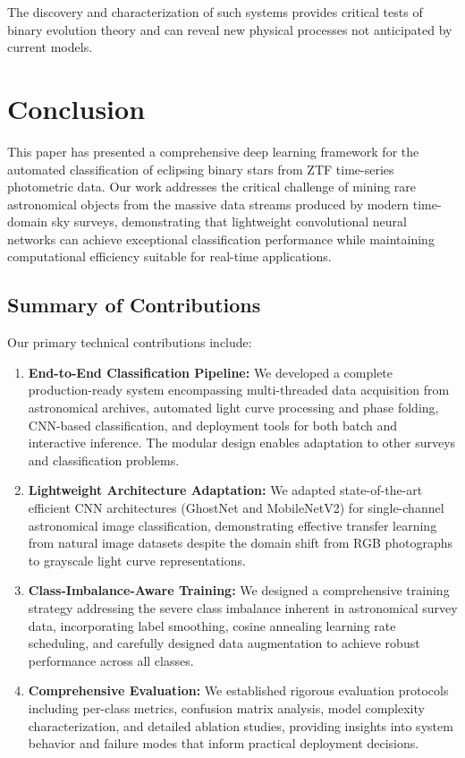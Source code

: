 \documentclass[11pt,a4paper]{article}
\begin{document}
The discovery and characterization of such systems provides critical tests of binary evolution theory and can reveal new physical processes not anticipated by current models.

\section{Conclusion}\label{sec:conclusion}

This paper has presented a comprehensive deep learning framework for the automated classification of eclipsing binary stars from ZTF time-series photometric data. Our work addresses the critical challenge of mining rare astronomical objects from the massive data streams produced by modern time-domain sky surveys, demonstrating that lightweight convolutional neural networks can achieve exceptional classification performance while maintaining computational efficiency suitable for real-time applications.

\subsection{Summary of Contributions}

Our primary technical contributions include:

\begin{enumerate}
    \item \textbf{End-to-End Classification Pipeline:} We developed a complete production-ready system encompassing multi-threaded data acquisition from astronomical archives, automated light curve processing and phase folding, CNN-based classification, and deployment tools for both batch and interactive inference. The modular design enables adaptation to other surveys and classification problems.
    
    \item \textbf{Lightweight Architecture Adaptation:} We adapted state-of-the-art efficient CNN architectures (GhostNet and MobileNetV2) for single-channel astronomical image classification, demonstrating effective transfer learning from natural image datasets despite the domain shift from RGB photographs to grayscale light curve representations.
    
    \item \textbf{Class-Imbalance-Aware Training:} We designed a comprehensive training strategy addressing the severe class imbalance inherent in astronomical survey data, incorporating label smoothing, cosine annealing learning rate scheduling, and carefully designed data augmentation to achieve robust performance across all classes.
    
    \item \textbf{Comprehensive Evaluation:} We established rigorous evaluation protocols including per-class metrics, confusion matrix analysis, model complexity characterization, and detailed ablation studies, providing insights into system behavior and failure modes that inform practical deployment decisions.
\end{enumerate}
\end{document}
